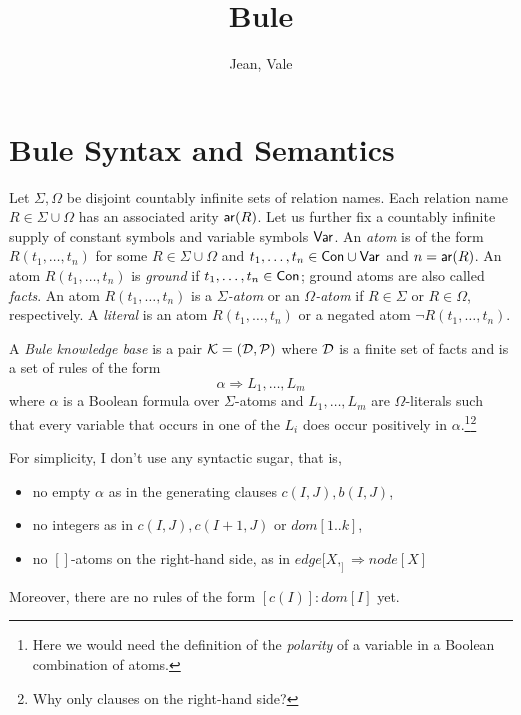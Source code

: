 \documentclass{article}
\author{Jean, Vale}
\title{Bule}
\begin{document}
\maketitle

\section{Bule Syntax and Semantics}

Let $\Sigma,\Omega$ be disjoint countably infinite sets of relation
names. Each relation name $R\in \Sigma\cup\Omega$ has an associated
arity $\mathsf{ar}(R)$. Let us further fix a countably infinite supply of
constant symbols  and variable symbols $\mathsf{Var}$. An
\emph{atom} is of the form $R(t_1,\ldots,t_n)$ for some $R\in
\Sigma\cup\Omega$ and $t_1,\ldots,t_n\in\mathsf{Con}\cup\mathsf{Var}$ and
$n=\mathsf{ar}(R)$. An atom $R(t_1,\ldots,t_n)$ is \emph{ground} if
$t_1,\ldots,t_n\in\mathsf{Con}$; ground atoms are also called
\emph{facts}. An atom $R(t_1,\ldots,t_n)$ is a \emph{$\Sigma$-atom} or
an \emph{$\Omega$-atom} if $R\in \Sigma$ or $R\in \Omega$,
respectively. A \emph{literal} is an atom $R(t_1,\ldots,t_n)$ or a
negated atom $\neg R(t_1,\ldots,t_n)$.

A \emph{Bule knowledge base} is a pair $\mathcal{K}=(\mathcal{D},\mathcal{P})$ where $\mathcal{D}$ is a
finite set of facts and \Pmc is a set of rules of the form 
%
\[\alpha \Rightarrow L_1,\ldots,L_m\]
%
where $\alpha$ is a Boolean formula over $\Sigma$-atoms
and $L_1,\ldots,L_m$ are $\Omega$-literals such that every variable
that occurs in one of the $L_i$ does occur positively in
$\alpha$.\footnote{Here we would need the definition of the
  \emph{polarity} of a variable in a Boolean combination of
atoms.}\footnote{Why only clauses on the right-hand side?}
{\color{red}For simplicity, I don't use any syntactic sugar, that is,
%
\begin{itemize}

  \item no empty $\alpha$ as in the generating clauses
    $c(I,J),b(I,J)$,

  \item no integers as in $c(I,J),c(I+1,J)$ or $dom[1..k]$,

  \item no $[]$-atoms on the right-hand side, as in $edge[X,_]
    \Rightarrow node[X]$

\end{itemize}
Moreover, there are no rules of the form $[c(I)]:dom[I]$ yet. 
}
\end{document}
